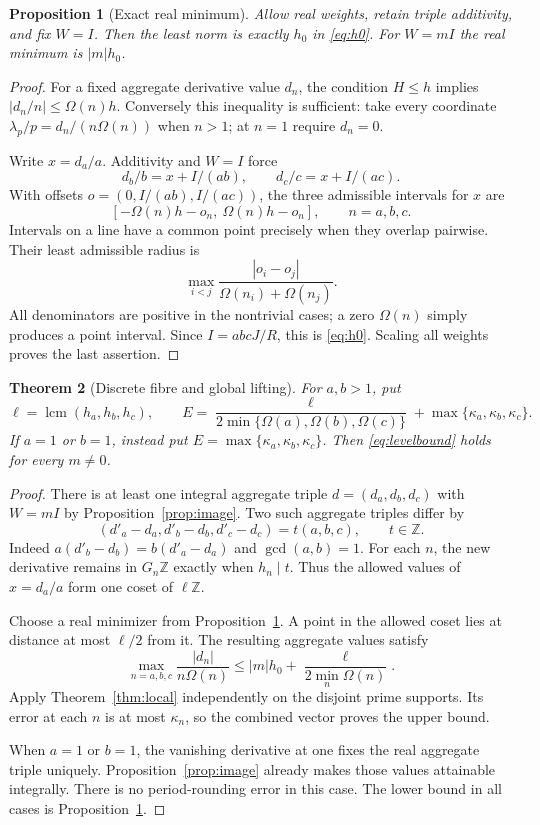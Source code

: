 \documentclass[11pt]{article}
\newtheorem{theorem}{Theorem}[section]
\newtheorem{proposition}[theorem]{Proposition}
\theoremstyle{definition}
\theoremstyle{remark}
\DeclareMathOperator{\lcm}{lcm}
\newcommand{\Z}{\mathbb Z}
\newcommand{\Om}{\Omega}
\begin{document}
\begin{proposition}[Exact real minimum]\label{prop:real}
Allow real weights, retain triple additivity, and fix $W=I$. Then the least norm is exactly $h_0$ in \eqref{eq:h0}. For $W=mI$ the real minimum is $|m|h_0$.
\end{proposition}
\begin{proof}
For a fixed aggregate derivative value $d_n$, the condition $H\le h$ implies $|d_n/n|\le\Om(n)h$. Conversely this inequality is sufficient: take every coordinate $\lambda_p/p=d_n/(n\Om(n))$ when $n>1$; at $n=1$ require $d_n=0$.

Write $x=d_a/a$. Additivity and $W=I$ force
\[
 d_b/b=x+I/(ab),\qquad d_c/c=x+I/(ac).
\]
With offsets $o=(0,I/(ab),I/(ac))$, the three admissible intervals for $x$ are
\[
 [-\Om(n)h-o_n,\ \Om(n)h-o_n],\qquad n=a,b,c.
\]
Intervals on a line have a common point precisely when they overlap pairwise. Their least admissible radius is
\[
 \max_{i<j}\frac{|o_i-o_j|}{\Om(n_i)+\Om(n_j)}.
\]
All denominators are positive in the nontrivial cases; a zero $\Om(n)$ simply produces a point interval. Since $I=abcJ/R$, this is \eqref{eq:h0}. Scaling all weights proves the last assertion.
\end{proof}

\begin{theorem}[Discrete fibre and global lifting]\label{thm:global}
For $a,b>1$, put
\[
 \ell=\lcm(h_a,h_b,h_c),\qquad
 E=\frac{\ell}{2\min\{\Om(a),\Om(b),\Om(c)\}}+
       \max\{\kappa_a,\kappa_b,\kappa_c\}.
\]
If $a=1$ or $b=1$, instead put $E=\max\{\kappa_a,\kappa_b,\kappa_c\}$. Then \eqref{eq:levelbound} holds for every $m\ne0$.
\end{theorem}
\begin{proof}
There is at least one integral aggregate triple $d=(d_a,d_b,d_c)$ with $W=mI$ by Proposition~\ref{prop:image}. Two such aggregate triples differ by
\[
 (d'_a-d_a,d'_b-d_b,d'_c-d_c)=t(a,b,c),\qquad t\in\Z.
\]
Indeed $a(d'_b-d_b)=b(d'_a-d_a)$ and $\gcd(a,b)=1$. For each $n$, the new derivative remains in $G_n\Z$ exactly when $h_n\mid t$. Thus the allowed values of $x=d_a/a$ form one coset of $\ell\Z$.

Choose a real minimizer from Proposition~\ref{prop:real}. A point in the allowed coset lies at distance at most $\ell/2$ from it. The resulting aggregate values satisfy
\[
 \max_{n=a,b,c}\frac{|d_n|}{n\Om(n)}
 \le |m|h_0+\frac{\ell}{2\min_n\Om(n)}.
\]
Apply Theorem~\ref{thm:local} independently on the disjoint prime supports. Its error at each $n$ is at most $\kappa_n$, so the combined vector proves the upper bound.

When $a=1$ or $b=1$, the vanishing derivative at one fixes the real aggregate triple uniquely. Proposition~\ref{prop:image} already makes those values attainable integrally. There is no period-rounding error in this case. The lower bound in all cases is Proposition~\ref{prop:real}.
\end{proof}
\end{document}
